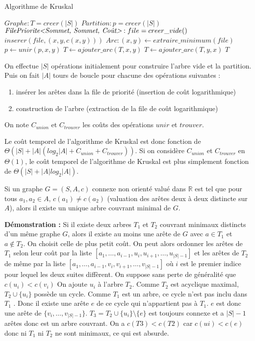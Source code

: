 \documentclass[../../../main.tex]{subfiles}
\begin{document}
\begin{algorithm}
\caption{Algorithme de Kruskal\label{alg:kruskal}}
$Graphe:T = creer(|S|)$
$Partition:p = creer(|S|)$\;
$\textit{FilePriorite\textless Sommet, Sommet, Coût\textgreater}:file = creer\_vide()$
 {
	 {
		$inserer(file, (x, y, c(x, y)))$\;
	}
}
 {
	$Arc:(x, y)\leftarrow extraire\_minimum(file)$
	 {
		$p\leftarrow unir(p, x, y)$\;
		$T\leftarrow ajouter\_arc(T, x, y)$\;
		$T\leftarrow ajouter\_arc(T, y, x)$\;
	}
}
\Return $T$\;
\end{algorithm}

On effectue $|S|$ opérations initialement pour construire l'arbre vide et la partition. Puis on fait $|A|$
tours de boucle pour chacune des opérations suivantes :
\begin{enumerate}
	\item insérer les arêtes dans la file de priorité (insertion de coût logarithmique)
	\item construction de l'arbre (extraction de la file de coût logarithmique)
\end{enumerate}
On note $C_{union}$ et $C_{trouver}$ les coûts des opérations $unir$ et $trouver$.

Le coût temporel de l'algorithme de Kruskal est donc fonction de $\Theta(|S|+|A|(log_2|A| + C_{union} + C_{trouver}))$.
Si on considère $C_{union}$ et $C_{trouver}$ en $\Theta(1)$, le coût temporel de l'algorithme de Kruskal est plus
simplement fonction de $\Theta(|S| + |A|log_2|A|)$.

 Si un graphe $G = (S, A, c)$ connexe non
orienté valué dans $\mathbb{R}$ est tel que pour tous $a_1 , a_2\in A$, $c(a_1)\neq c(a_2)$ (valuation des arêtes deux à deux
distincte sur $A$), alors il existe un unique arbre couvrant minimal de $G$.

\textbf{Démonstration :} Si il existe deux arbres $T_1$ et $T_2$ couvrant minimaux distincts d'un même graphe
$G$, alors il existe au moins une arête de $G$ avec $a\in T_1$ et $a\notin T_2$. On choisit celle de plus petit coût.
On peut alors ordonner les arêtes de $T_1$ selon leur coût par la liste $[a_1, \dots , a_{i-1} , u_i , u_{i+1} , \dots , u_{|S|-1} ]$ et
les arêtes de $T_2$ de même par la liste $[a_1 , \dots , a_{i-1} , v_i , v_{i+1} ,\dots, v_{|S|-1} ]$ où $i$ est le premier indice pour
lequel les deux suites diffèrent. On suppose sans perte de généralité que $c(u_i ) < c(v_i )$ On ajoute $u_i$ à
l'arbre $T_2$. Comme $T_2$ est acyclique maximal, $T_2\cup\{u_i\}$ possède un cycle. Comme $T_1$ est un arbre, ce
cycle n'est pas inclu dans $T_1$ . Donc il existe une arête $e$ de ce cycle qui n'appartient pas à $T_1$. $e$ est
donc une arête de $\{v_i ,\dots , v_{|S|-1}\}$. $T_3 = T_2 \cup \{u_i \} \setminus\{e\}$ est toujours connexe et a $|S| - 1$ arêtes donc
est un arbre couvrant. On a $c(T3 ) < c(T2 )$ car $c(ui ) < c(e)$ donc ni $T_1$ ni $T_2$ ne sont minimaux, ce qui
est absurde.
\end{document}
